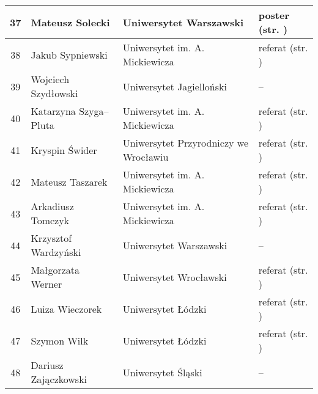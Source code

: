 \documentclass[12pt,oneside]{book}
\begin{document}
\begin{tabular}{||c|l|l|l||}
37	 & Mateusz Solecki & Uniwersytet Warszawski & poster (str. \pageref{solecki}) \\\hline	
38	 & Jakub Sypniewski & Uniwersytet im. A. Mickiewicza & referat (str. \pageref{sypniewski}) \\\hline
39	 & Wojciech Szydłowski & Uniwersytet Jagielloński & -- \\\hline
40	 & Katarzyna Szyga--Pluta & Uniwersytet im. A. Mickiewicza & referat (str. \pageref{kendzierski}) \\\hline
41	 & Kryspin Świder & Uniwersytet Przyrodniczy we Wrocławiu & referat (str. \pageref{swider}) \\\hline
42	 & Mateusz Taszarek & Uniwersytet im. A. Mickiewicza & referat (str. \pageref{taszarek}) \\\hline
43	 & Arkadiusz Tomczyk & Uniwersytet im. A. Mickiewicza & referat (str. \pageref{kendzierski}) \\\hline
44	 & Krzysztof Wardzyński & Uniwersytet Warszawski & -- \\\hline
45   & Małgorzata Werner & Uniwersytet Wrocławski & referat (str. \pageref{bilinska})  \\\hline
46   & Luiza Wieczorek & Uniwersytet Łódzki & referat (str. \pageref{wieczorek}) \\\hline
47   & Szymon Wilk & Uniwersytet Łódzki & referat (str. \pageref{wilk}) \\\hline
48   & Dariusz Zajączkowski & Uniwersytet Śląski & -- \\\hline
	
\hline
\hline
\end{tabular}


\printindex[a]
%


\backmatter



%
\end{document}
